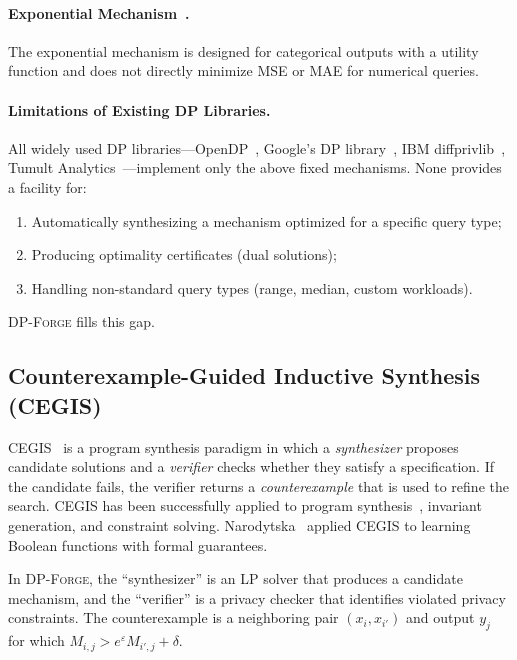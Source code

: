 \documentclass[11pt,a4paper]{article}
\newcommand{\dpforge}{\textsc{DP-Forge}}
\newcommand{\eps}{\varepsilon}
\begin{document}
\paragraph{Exponential Mechanism~\cite{mcsherry2007mechanism}.}
The exponential mechanism is designed for categorical outputs with a utility function
and does not directly minimize MSE or MAE for numerical queries.

\paragraph{Limitations of Existing DP Libraries.}
All widely used DP libraries---OpenDP~\cite{opendp2023}, Google's DP
library~\cite{google2019dp}, IBM diffprivlib~\cite{holohan2019diffprivlib},
Tumult Analytics~\cite{tumult2022}---implement only the above fixed mechanisms.
None provides a facility for:
\begin{enumerate}[nosep]
  \item Automatically synthesizing a mechanism optimized for a specific query type;
  \item Producing optimality certificates (dual solutions);
  \item Handling non-standard query types (range, median, custom workloads).
\end{enumerate}
\dpforge{} fills this gap.

\subsection{Counterexample-Guided Inductive Synthesis (CEGIS)}
\label{subsec:cegis}

CEGIS~\cite{solar2006combinatorial} is a program synthesis paradigm in which a
\emph{synthesizer} proposes candidate solutions and a \emph{verifier} checks
whether they satisfy a specification.  If the candidate fails, the verifier
returns a \emph{counterexample} that is used to refine the search.  CEGIS has
been successfully applied to program synthesis~\cite{solar2006combinatorial},
invariant generation, and constraint solving.  Narodytska~\cite{narodytska2019learning}
applied CEGIS to learning Boolean functions with formal guarantees.

In \dpforge{}, the ``synthesizer'' is an LP solver that produces a candidate
mechanism, and the ``verifier'' is a privacy checker that identifies violated
privacy constraints.  The counterexample is a neighboring pair $(x_i, x_{i'})$
and output $y_j$ for which $M_{i,j} > e^{\eps} M_{i',j} + \delta$.
\end{document}
